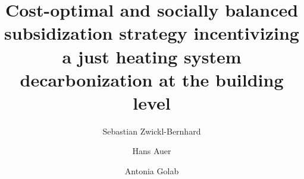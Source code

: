 \documentclass[review]{elsarticle}
\begin{document}
\begin{frontmatter}

\title{Cost-optimal and socially balanced subsidization strategy incentivizing a just heating system decarbonization at the building level}
\author[1]{Sebastian Zwickl-Bernhard}
\author[1]{Hans Auer}
\author[1]{Antonia Golab}
\address[1]{Energy Economics Group (EEG), Technische Universität Wien, Gusshausstrasse 25-29/E370-3, 1040 Wien, Austria}

\begin{abstract}

\end{abstract}

\begin{keyword}
	
\end{keyword}
\end{frontmatter}

\newpage
{}
\end{document}
